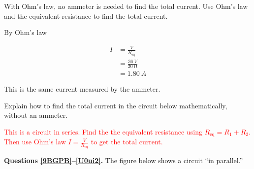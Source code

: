 \documentclass[answers]{exam}
\begin{document}
\begin{questions}
\question \label{xTyWs}
With Ohm's law, no ammeter is needed to find the total current. Use Ohm's law and the equivalent resistance to find the total current.

\begin{solutionorbox}[2.5cm]
By Ohm's law

\begin{align*}
    I &= \frac{V}{R_\mathrm{eq}} \\[1ex]
    &= \frac{\SI{36}{V}}{\SI{20}{\ohm}} \\[1ex]
    &= \boxed{\SI{1.80}{A}}
\end{align*}

This is the same current measured by the ammeter.
\end{solutionorbox}

\question
Explain how to find the total current in the circuit below mathematically, without an ammeter.

\begin{EnvUplevel}
\centering
\begin{minipage}{6.5cm}
\centering
{}
\end{minipage}%
\begin{minipage}{9cm}
\ifprintanswers 
\textcolor{red}{This is a circuit in series. Find the the equivalent resistance using $R_\mathrm{eq} = R_1 + R_2$. Then use Ohm's law $I = \frac{V}{R_\mathrm{eq}}$ to get the total current.}
\else 
\fillwithlines{35mm} 
\fi
\end{minipage}
\end{EnvUplevel}

\clearpage 

\begin{EnvUplevel}
\textbf{Questions \ref{9BGPB}--\ref{U0ui2}.} The figure below shows a circuit ``in parallel.''

\begin{center}
\end{center}
\end{EnvUplevel}


\end{questions}
\end{document}
